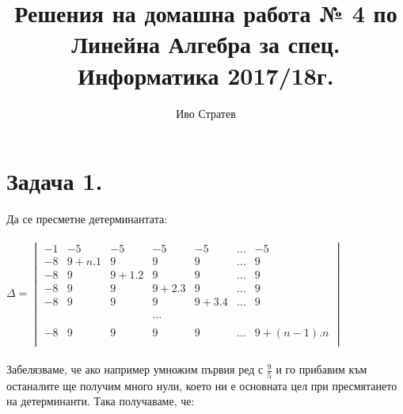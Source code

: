 \documentclass[a4paper, 12pt]{article}
\title{Решения на домашна работа № 4 по Линейна Алгебра за спец. Информатика 2017/18г.}
\author{Иво Стратев}
\begin{document}
    \maketitle
    \section*{Задача 1.} Да се пресметне детерминантата: \\\\
    $\Delta = \begin{vmatrix}
        -1 & -5 & -5 & -5 & -5 & \dots & -5\\
        -8 & 9 + n.1 & 9 & 9 & 9 & \dots & 9\\
        -8 & 9 & 9 + 1.2 & 9 & 9 & \dots & 9\\
        -8 & 9 & 9 & 9 + 2.3 & 9 & \dots & 9\\
        -8 & 9 & 9 & 9 & 9 + 3. 4 & \dots & 9\\
        \\
        ~ & ~ & ~ & \dots & ~ & ~ & ~\\
        \\
        -8 & 9 & 9 & 9 & 9 & \dots & 9 + (n - 1).n\\
    \end{vmatrix}$ \\\\
    
    Забелязваме, че ако например умножим първия ред с $\frac{9}{5}$
    и го прибавим към останалите ще получим много нули,
    което ни е основната цел при пресмятането на детерминанти. Така получаваме, че: \\\\
\end{document}
